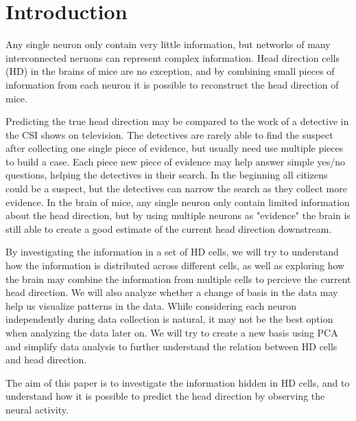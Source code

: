 \section{Introduction}
Any single neuron only contain very little information, but networks of many interconnected neruons can represent complex information. Head direction cells (HD) in the brains of mice are no exception, and by combining small pieces of information from each neuron it is possible to reconstruct the head direction of mice.

Predicting the true head direction may be compared to the work of a detective in the CSI shows on television. The detectives are rarely able to find the suspect after collecting one single piece of evidence, but usually need use multiple pieces to build a case. Each piece new piece of evidence may help answer simple yes/no questions, helping the detectives in their search. In the beginning all citizens could be a suspect, but the detectives can narrow the search as they collect more evidence. In the brain of mice, any single neuron only contain limited information about the head direction, but by using multiple neurons as "evidence" the brain is still able to create a good estimate of the current head direction downstream.  

By investigating the information in a set of HD cells, we will try to understand how the information is distributed across different cells, as well as exploring how the brain may combine the information from multiple cells to percieve the current head direction.
We will also analyze whether a change of basis in the data may help us visualize patterns in the data. While considering each neuron independently during data collection is natural, it may not be the best option when analyzing the data later on. We will try to create a new basis using PCA and simplify data analysis to further understand the relation between HD cells and head direction.

The aim of this paper is to investigate the information hidden in HD cells, and to understand how it is possible to predict the head direction by observing the neural activity.

